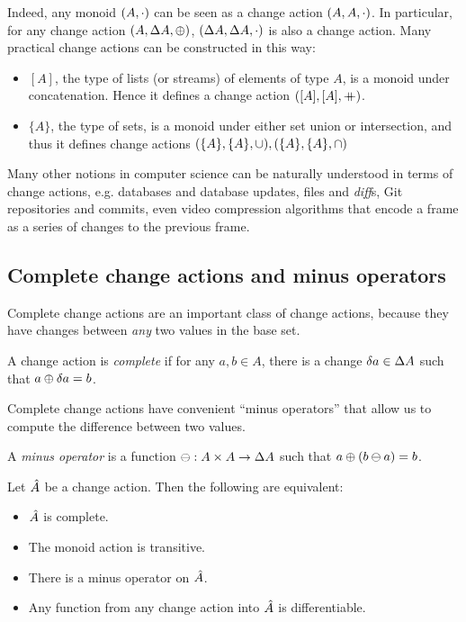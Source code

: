 Indeed, any monoid $(A, \cdot)$ can be seen as a change action $(A,A,\cdot)$. In particular,
for any change action $(A,\Delta A,\oplus)$,
$(\Delta A,\Delta A,\cdot)$ is also a change action. Many practical change actions
can be constructed in this way:
\begin{itemize}
  \item $[A]$, the type of lists (or streams) of elements of type $A$, is a monoid under
  concatenation. Hence it defines a change action $([A],[A],\mathbin{+\mkern-10mu+})$.
  \item $\{A\}$, the type of sets, is a monoid under either set union or intersection,
  and thus it defines change actions $(\{A\},\{A\},\cup),(\{A\},\{A\},\cap)$
\end{itemize}

Many other notions in computer science can be naturally understood in terms of change actions, e.g. databases
and database updates, files and \textit{diff}s, Git repositories and commits, even video compression
algorithms that encode a frame as a series of changes to the previous frame.

\subsection{Complete change actions and minus operators}

Complete change actions are an important class of change actions, because they
have changes between \emph{any} two values in the base set.

\begin{defn}
  A change action is \textit{complete} if for any $a, b \in A$, there is
  a change $\delta a \in \Delta A$ such that $a \oplus \delta a = b$.
\end{defn}

Complete change actions have convenient ``minus operators'' that allow us to
compute the difference between two values.

\begin{defn}
  A \textit{minus operator} is a function $\ominus: A \times A \rightarrow \Delta A$ such that $a \oplus (b \ominus a) = b$.
\end{defn}

\begin{prop}
  Let $\hat{A}$ be a change action. Then the following are equivalent:
  \begin{itemize}
    \item $\hat{A}$ is complete.
    \item The monoid action is transitive.
    \item There is a minus operator on $\hat{A}$.
    \item Any function from any change action into $\hat{A}$ is differentiable.
  \end{itemize}
\end{prop}

